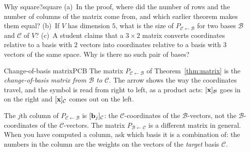 \documentclass[11pt]{article}
\begin{document}
\begin{think}{Why square?}{square}
(a)~In the proof, where did the number of rows and the number of columns of the matrix come from, and which earlier theorem makes them equal? (b)~If $V$ has dimension $5$, what is the size of $P_{\mathcal{C}\leftarrow\mathcal{B}}$ for two bases $\mathcal{B}$ and $\mathcal{C}$ of $V$? (c)~A student claims that a $3\times2$ matrix converts coordinates relative to a basis with $2$ vectors into coordinates relative to a basis with $3$ vectors of the same space. Why is there no such pair of bases?
\end{think}

\begin{defn}{Change-of-basis matrix}{PCB}
The matrix $P_{\mathcal{C}\leftarrow\mathcal{B}}$ of Theorem~\ref{thm:matrix} is the \emph{change-of-basis matrix from $\mathcal{B}$ to $\mathcal{C}$}. The arrow shows the way the coordinates travel, and the symbol is read from right to left, as a product acts: $[\mathbf{x}]_{\mathcal{B}}$ goes in on the right and $[\mathbf{x}]_{\mathcal{C}}$ comes out on the left.
\end{defn}

\begin{warn}
The $j$th column of $P_{\mathcal{C}\leftarrow\mathcal{B}}$ is $[\mathbf{b}_j]_{\mathcal{C}}$: the $\mathcal{C}$-coordinates of the $\mathcal{B}$-vectors, not the $\mathcal{B}$-coordinates of the $\mathcal{C}$-vectors. The matrix $P_{\mathcal{B}\leftarrow\mathcal{C}}$ is a different matrix in general. When you have computed a column, ask which basis it is a combination of: the numbers in the column are the weights on the vectors of the \emph{target} basis $\mathcal{C}$.
\end{warn}
\end{document}
